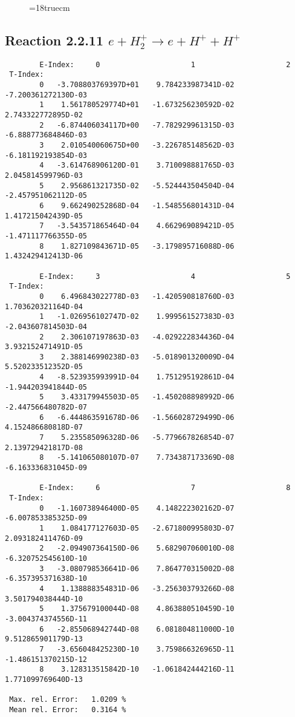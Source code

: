 \begin{figure} \label{2.2.10}
\epsfxsize=18truecm
\end{figure}
\newpage



\subsection{
Reaction 2.2.11   $e + H_2^+      \rightarrow e + H^+ + H^+ $
}


\begin{verbatim}
        E-Index:     0                     1                     2
 T-Index:
        0   -3.708803769397D+01    9.784233987341D-02   -7.200361272130D-03
        1    1.561780529774D+01   -1.673256230592D-02    2.743322772895D-02
        2   -6.874406034117D+00   -7.782929961315D-03   -6.888773684846D-03
        3    2.010540060675D+00   -3.226785148562D-03   -6.181192193854D-03
        4   -3.614768906120D-01    3.710098881765D-03    2.045814599796D-03
        5    2.956861321735D-02   -5.524443504504D-04   -2.457951062112D-05
        6    9.662490252868D-04   -1.548556801431D-04    1.417215042439D-05
        7   -3.543571865464D-04    4.662969089421D-05   -1.471117766355D-05
        8    1.827109843671D-05   -3.179895716088D-06    1.432429412413D-06

        E-Index:     3                     4                     5
 T-Index:
        0    6.496843022778D-03   -1.420590818760D-03    1.703620321164D-04
        1   -1.026956102747D-02    1.999561527383D-03   -2.043607814503D-04
        2    2.306107197863D-03   -4.029222834436D-04    3.932152471491D-05
        3    2.388146990238D-03   -5.018901320009D-04    5.520233512352D-05
        4   -8.523935993991D-04    1.751295192861D-04   -1.944203941844D-05
        5    3.433179945503D-05   -1.450208898992D-06   -2.447566480782D-07
        6   -6.444863591678D-06   -1.566028729499D-06    4.152486680818D-07
        7    5.235585096328D-06   -5.779667826854D-07    2.139729421817D-08
        8   -5.141065080107D-07    7.734387173369D-08   -6.163336831045D-09

        E-Index:     6                     7                     8
 T-Index:
        0   -1.160738946400D-05    4.148222302162D-07   -6.007853385325D-09
        1    1.084177127603D-05   -2.671800995803D-07    2.093182411476D-09
        2   -2.094907364150D-06    5.682907060010D-08   -6.320752545610D-10
        3   -3.080798536641D-06    7.864770315002D-08   -6.357395371638D-10
        4    1.138888354831D-06   -3.256303793266D-08    3.501794038444D-10
        5    1.375679100044D-08    4.863880510459D-10   -3.004374374556D-11
        6   -2.855068942744D-08    6.081804811000D-10    9.512865901179D-13
        7   -3.656048425230D-10    3.759866326965D-11   -1.486151370215D-12
        8    3.128313515842D-10   -1.061842444216D-11    1.771099769640D-13

 Max. rel. Error:   1.0209 %
 Mean rel. Error:   0.3164 %

\end{verbatim}
